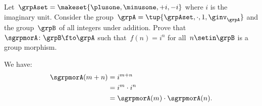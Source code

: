 \begin{exercise}
    Let~$\grpAset=\makeset{\plusone,\minusone,+i,-i}$ where $i$ is the imaginary unit.
    Consider the group~$\grpA=\tup{\grpAset, \cdot, 1, \ginv_\grpA}$ and the group~$\grpB$ of all integers under addition.
    Prove that~$\sgrpmorA\colon \grpB \fto \grpA$ such that~$f(n)=i^n$ for all~$n\setin \grpB$ is a group morphism.
\end{exercise}
\begin{solution}
    We have:
    \begin{equation}
        \begin{aligned}
            \sgrpmorA(m+n) & =i^{m+n} \\
                           & =i^m \cdot i^n \\
                           & =\sgrpmorA(m)\cdot \sgrpmorA(n).
        \end{aligned}
    \end{equation}
\end{solution}



